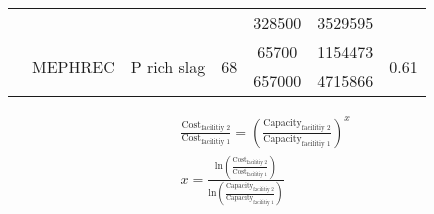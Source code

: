 \documentclass[authoryear]{elsarticle}
\begin{document}
\begin{table}[h]
{\begin{tabular}{@{}ccccccc@{}}
			&         &            &                                                                                     & 328500                                                         & 3529595                                                     &                                    \\
			& \multirow{2}{*}{MEPHREC}           & \multirow{2}{*}{P rich slag}                & \multirow{2}{*}{68}                                                                                    & 65700                                                          & 1154473                                                     & \multirow{2}{*}{0.61} \\
			&            &                &                                                                                     & 657000                                                         & 4715866                                                     &                                    \\ \bottomrule
		\end{tabular}
	}
\end{table}

\begin{align}
	& \frac{\text{Cost}_{\text{facilitiy 2}}}{\text{Cost}_{\text{facilitiy 1}}} = \left( \frac{\text{Capacity}_{\text{facilitiy 2}}}{\text{Capacity}_{\text{facilitiy 1}}} \right)^x \label{eq:CostoToCapacity1}\\
	& x = \frac{\text{ln} \left(\frac{\text{Cost}_{\text{facilitiy 2}}}{\text{Cost}_{\text{facilitiy 1}}} \right) }{\text{ln} \left( \frac{\text{Capacity}_{\text{facilitiy 2}}}{\text{Capacity}_{\text{facilitiy 1}}}\right) } \label{eq:CostoToCapacityLinearization}
\end{align}
\end{document}
